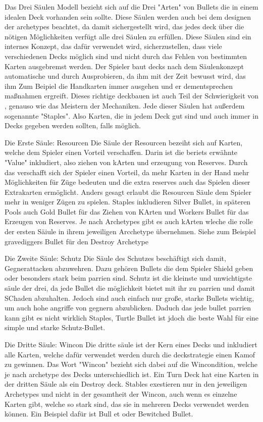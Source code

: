 Das Drei Säulen Modell bezieht sich auf die Drei "Arten" von Bullets die in einem idealen Deck vorhanden sein sollte.
Diese Säulen werden auch bei dem designen der archetypes beachtet, da damit sichergestellt wird, das jedes deck über
die nötigen Möglichkeiten verfügt alle drei Säulen zu erfüllen.
Diese Säulen sind ein internes Konzept, das dafür verwendet wird, sicherzustellen, dass viele verschiedenen Decks möglich sind
und nicht durch das Fehlen von bestimmten Karten ausgebremst werden.
Der Spieler baut decks nach dem Säulenkonzept automatische und durch Ausprobieren, da ihm mit der Zeit bewusst wird, das
ihm Zum Beipiel die Handkarten immer ausgehen und er dementsprechen maßnahmen ergreift. Dieses richtige deckbauen ist auch Teil der
Schwierigkeit von \FF, genauso wie das Meistern der Mechaniken.
Jede dieser Säulen hat außerdem sogenannte "Staples". Also Karten, die in jedem Deck gut sind und auch immer in Decks gegeben werden sollten, falls möglich.


Die Erste Säule: Resourcen
Die Säule der Resourcen bezeiht sich auf Karten, welche dem Spieler einen Vorteil verschaffen. Darin ist die beriets
erwähnte "Value" inkludiert, also ziehen von kArten und erzeugung von Reserves. Durch das verschafft sich der Spieler einen Vorteil,
da mehr Karten in der Hand mehr Möglichkeiten für Züge bedeuten und die extra reserves auch das Spielen dieser Extrakarten ermöglicht.
Anders gesagt erlaubt die Resourcen Säule dem Spieler mehr in weniger Zügen zu spielen.
Staples inkludieren Silver Bullet, in späteren Pools auch Gold Bullet für das Ziehen von KArten und Workers Bullet für das Erzeugen von Reserves.
Je nach Archetypes gibt es auch kArten wleche die rolle der ersten Säiule in ihrem jeweiligen Arcchetype übernehmen.
Siehe zum Beispiel gravediggers Bullet für den Destroy Archetype


Die Zweite Säule: Schutz
Die Säule des Schutzes beschäftigt sich damit, Gegnerattacken abzuwehren. Dazu gehören Bullets die dem Spieler Shield
geben oder besonders stark beim parrien sind. Schutz ist die kleinste und unwichtigste säule der drei, da jede Bullet
die möglichkeit bietet mit ihr zu parrien und damit SChaden abzuhalten. Jedoch sind auch einfach nur große, starke Bullets
wichtig, um auch hohe angriffe von gegnern abzublicken. Daduch das jede bullet parrien kann gibt es nicht wirklich Staples,
Turtle Bullet ist jdoch die beste Wahl für eine simple und starke Schutz-Bullet.


Die Dritte Säule: Wincon
Die dritte säule ist der Kern eines Decks und inkludiert alle Karten, welche dafür verwendet werden durch die deckstrategie einen Kamof zu gewinnen.
Das Wort "Wincon" bezieht sich dabei auf die Wincondition, welche je nach archetype des Decks unterschiedlich ist.
Ein Turn Deck hat eine Karten in der dritten Säule als ein Destroy deck. Stables exestieren nur in den jeweiligen Archetypes
und nicht in der gesamtheit der Wincon, auch wenn es einzelne Karten gibt, welche so stark sind, das sie in mehreren Decks verwendet werden können.
Ein Beispiel dafür ist Bull et oder Bewitched Bullet.


